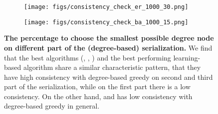 \begin{figure}[!t]
    \centering
    \begin{subfigure}[b]{0.95\linewidth}
         \centering
         \texttt{[image: figs/consistency\_check\_er\_1000\_30.png]}
     \end{subfigure}
    \begin{subfigure}[b]{0.95\linewidth}
         \centering
         \texttt{[image: figs/consistency\_check\_ba\_1000\_15.png]}
     \end{subfigure}
    \caption{\textbf{The percentage to choose the smallest possible degree node on different part of the (degree-based) serialization.} We find that the best algorithms (\onlinemis, \redumis, \isco) and the best performing learning-based algorithm \lwd share a similar characteristic pattern, that they have high consistency with degree-based greedy on second and third part of the serialization, while on the first part there is a low consistency. On the other hand, \pcqo and \difusco has low consistency with degree-based greedy in general.}
    \label{fig:serialization}
\end{figure}
